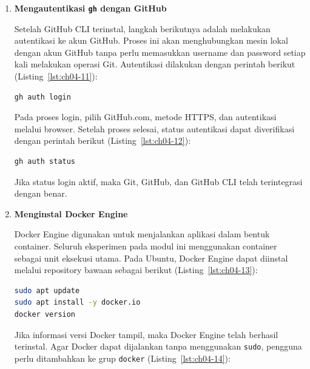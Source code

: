\begin{enumerate}
\begin{lstlisting}[language=bash, caption={Memperbarui indeks paket (2)}, label={lst:ch04-10}]
sudo apt update
sudo apt install -y gh
gh --version
\end{lstlisting}

Jika versi \texttt{gh} berhasil ditampilkan, maka GitHub CLI telah terinstal
dan siap digunakan.

\item \textbf{Mengautentikasi \texttt{gh} dengan GitHub}

Setelah GitHub CLI terinstal, langkah berikutnya adalah melakukan autentikasi
ke akun GitHub. Proses ini akan menghubungkan mesin lokal dengan akun GitHub
tanpa perlu memasukkan username dan password setiap kali melakukan operasi Git.
Autentikasi dilakukan dengan perintah berikut (Listing~\ref{lst:ch04-11}):

\begin{lstlisting}[language=bash, caption={Perintah gh auth login}, label={lst:ch04-11}]
gh auth login
\end{lstlisting}

Pada proses login, pilih GitHub.com, metode HTTPS, dan autentikasi melalui
browser. Setelah proses selesai, status autentikasi dapat diverifikasi
dengan perintah berikut (Listing~\ref{lst:ch04-12}):

\begin{lstlisting}[language=bash, caption={Perintah gh auth status}, label={lst:ch04-12}]
gh auth status
\end{lstlisting}

Jika status login aktif, maka Git, GitHub, dan GitHub CLI telah terintegrasi
dengan benar.

\item \textbf{Menginstal Docker Engine}

Docker Engine digunakan untuk menjalankan aplikasi dalam bentuk container.
Seluruh eksperimen pada modul ini menggunakan container sebagai unit eksekusi
utama. Pada Ubuntu, Docker Engine dapat diinstal melalui repository bawaan
sebagai berikut (Listing~\ref{lst:ch04-13}):

\begin{lstlisting}[language=bash, caption={Memperbarui indeks paket (3)}, label={lst:ch04-13}]
sudo apt update
sudo apt install -y docker.io
docker version
\end{lstlisting}

Jika informasi versi Docker tampil, maka Docker Engine telah berhasil
terinstal. Agar Docker dapat dijalankan tanpa menggunakan \texttt{sudo},
pengguna perlu ditambahkan ke grup \texttt{docker} (Listing~\ref{lst:ch04-14}):


\end{enumerate}
